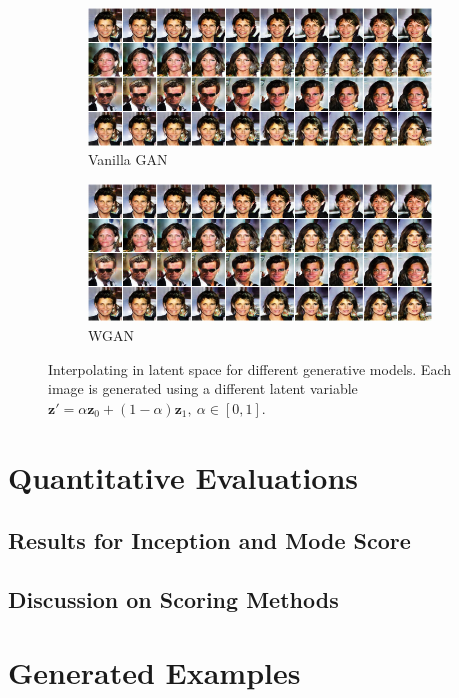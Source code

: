 \documentclass[table]{article}
\def\*#1{\mathbf{#1}}
\begin{document}
\begin{figure}[ht]
  \centering
  \begin{subfigure}{\textwidth}
    \centering
    \includegraphics[scale=0.5]{imgs/gan_latent_lerp}
    \caption{Vanilla GAN}
  \end{subfigure}

  \vspace*{3mm}
  \begin{subfigure}{\textwidth}
    \centering
    \includegraphics[scale=0.5]{imgs/gan_latent_lerp}
    \caption{WGAN}
  \end{subfigure}
  \caption{Interpolating in latent space for different generative models. Each image is generated using a different latent variable $\*z' = \alpha \*z_0 + (1-\alpha)\*z_1, \ \alpha \in [0,1]$.}
  \label{latent_lerp}
\end{figure}

\section{Quantitative Evaluations}
\subsection{Results for Inception and Mode Score}
\subsection{Discussion on Scoring Methods}




\appendix
\section{Generated Examples}
\end{document}
